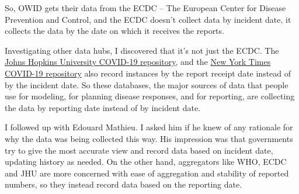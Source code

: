 \documentclass[10pt,reqno]{amsart}
\begin{document}
So, OWID gets their data from the ECDC -- The European Center for
Disease Prevention and Control, and the ECDC doesn't collect data by
incident date, it collects the data by the date on which it receives
the reports.

Investigating other data hubs, I discovered that it's not just the
ECDC.  The \href{https://github.com/CSSEGISandData/COVID-19}{Johns
  Hopkins University COVID-19 repository}, and the
\href{https://github.com/nytimes/covid-19-data}{New York Times
  COVID-19 repository} also record instances by the report receipt
date instead of by the incident date.  So these databases, the major
sources of data that people use for modeling, for planning disease
responses, and for reporting, are collecting the data by reporting
date instead of by incident date.\nocite{JHU2020data,NYT2020data}

I followed up with Edouard Mathieu.  I asked him if he knew of any
rationale for why the data was being collected this way.  His
impression was that governments try to give the most accurate view and
record data based on incident date, updating history as needed.  On
the other hand, aggregators like WHO, ECDC and JHU are more concerned
with ease of aggregation and stability of reported numbers, so they
instead record data based on the reporting date. \cite{Mathieu2020Dates}





\end{document}
